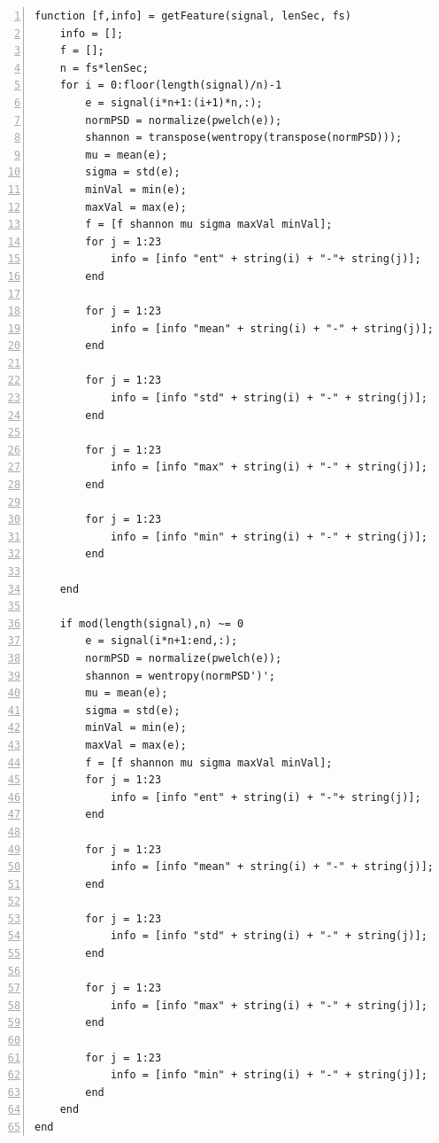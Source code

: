 \documentclass[11pt]{article}
\begin{document}
\begin{lstlisting}[backgroundcolor=\color{lbcolor}, frame=single,
    numbers=left,style=Matlab-editor]
    function [f,info] = getFeature(signal, lenSec, fs)
    info = [];
    f = [];
    n = fs*lenSec;
    for i = 0:floor(length(signal)/n)-1
        e = signal(i*n+1:(i+1)*n,:);
        normPSD = normalize(pwelch(e));
        shannon = transpose(wentropy(transpose(normPSD)));
        mu = mean(e);
        sigma = std(e);
        minVal = min(e);
        maxVal = max(e);
        f = [f shannon mu sigma maxVal minVal];
        for j = 1:23
            info = [info "ent" + string(i) + "-"+ string(j)];
        end

        for j = 1:23
            info = [info "mean" + string(i) + "-" + string(j)];
        end

        for j = 1:23
            info = [info "std" + string(i) + "-" + string(j)];
        end

        for j = 1:23
            info = [info "max" + string(i) + "-" + string(j)];
        end

        for j = 1:23
            info = [info "min" + string(i) + "-" + string(j)];
        end

    end

    if mod(length(signal),n) ~= 0
        e = signal(i*n+1:end,:);
        normPSD = normalize(pwelch(e));
        shannon = wentropy(normPSD')';
        mu = mean(e);
        sigma = std(e);
        minVal = min(e);
        maxVal = max(e);
        f = [f shannon mu sigma maxVal minVal];
        for j = 1:23
            info = [info "ent" + string(i) + "-"+ string(j)];
        end

        for j = 1:23
            info = [info "mean" + string(i) + "-" + string(j)];
        end

        for j = 1:23
            info = [info "std" + string(i) + "-" + string(j)];
        end

        for j = 1:23
            info = [info "max" + string(i) + "-" + string(j)];
        end

        for j = 1:23
            info = [info "min" + string(i) + "-" + string(j)];
        end
    end
end
\end{lstlisting}
\end{document}
